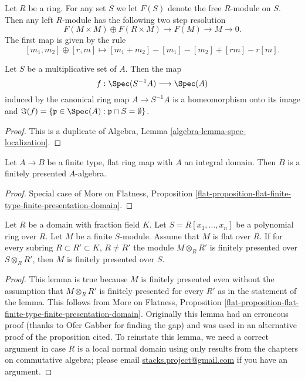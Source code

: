 \begin{remark}
\label{remark-projective-resolution}
Let $R$ be a ring.
For any set $S$ we let $F(S)$ denote the free $R$-module on $S$.
Then any left $R$-module has the following two step resolution
$$
F(M \times M) \oplus F(R \times M) \to F(M) \to M \to 0.
$$
The first map is given by the rule
$$
[m_1, m_2] \oplus [r, m] \mapsto [m_1 + m_2] - [m_1] - [m_2] + [rm] - r[m].
$$
\end{remark}

\begin{lemma}
\label{lemma-spec-localization-first}
Let $S$ be a multiplicative set of $A$. Then the map
$$
f: \Spec(S^{-1}A)\longrightarrow \Spec(A)
$$
induced by the canonical ring map
$A \to S^{-1}A$ is a homeomorphism onto its image and
$\Im(f) = \{ \mathfrak p \in \Spec(A) : \mathfrak p\cap S = \emptyset \}$.
\end{lemma}

\begin{proof}
This is a duplicate of Algebra, Lemma \ref{algebra-lemma-spec-localization}.
\end{proof}

\begin{lemma}
\label{lemma-finite-type-flat-over-integral-algebra}
Let $A \to B$ be a finite type, flat ring map with $A$ an integral
domain. Then $B$ is a finitely presented $A$-algebra.
\end{lemma}

\begin{proof}
Special case of More on Flatness, Proposition
\ref{flat-proposition-flat-finite-type-finite-presentation-domain}.
\end{proof}

\begin{lemma}
\label{lemma-helper-finite-type-flat-finite-presentation}
Let $R$ be a domain with fraction field $K$.
Let $S = R[x_1, \ldots, x_n]$ be a polynomial ring over $R$.
Let $M$ be a finite $S$-module. Assume that $M$ is flat over $R$.
If for every subring $R \subset R' \subset K$, $R \not = R'$
the module $M \otimes_R R'$ is finitely presented
over $S \otimes_R R'$, then $M$ is finitely presented over $S$.
\end{lemma}

\begin{proof}
This lemma is true because $M$ is finitely presented even without the
assumption that $M \otimes_R R'$ is finitely presented for every $R'$
as in the statement of the lemma. This follows from More on Flatness,
Proposition \ref{flat-proposition-flat-finite-type-finite-presentation-domain}.
Originally this lemma had an erroneous proof (thanks to Ofer Gabber
for finding the gap) and was used in an alternative proof of
the proposition cited. To reinstate this lemma, we need a correct argument
in case $R$ is a local normal domain using only
results from the chapters on commutative algebra; please email
\href{mailto:stacks.project@gmail.com}{stacks.project@gmail.com}
if you have an argument.
\end{proof}

